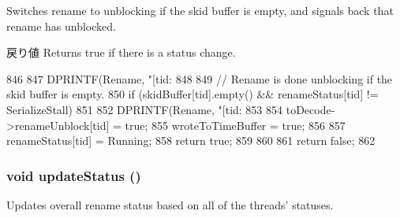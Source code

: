 \label{classDefaultRename_a9cc3b95f6969935f78c0158aa5145021}
Switches rename to unblocking if the skid buffer is empty, and signals back that rename has unblocked. \begin{DoxyReturn}{戻り値}
Returns true if there is a status change. 
\end{DoxyReturn}



\begin{DoxyCode}
846 {
847     DPRINTF(Rename, "[tid:%
848 
849     // Rename is done unblocking if the skid buffer is empty.
850     if (skidBuffer[tid].empty() && renameStatus[tid] != SerializeStall) {
851 
852         DPRINTF(Rename, "[tid:%
853 
854         toDecode->renameUnblock[tid] = true;
855         wroteToTimeBuffer = true;
856 
857         renameStatus[tid] = Running;
858         return true;
859     }
860 
861     return false;
862 }
\end{DoxyCode}
\hypertarget{classDefaultRename_a4bb9486757ce225941aaaf759b357a57}{
\subsubsection[{updateStatus}]{\setlength{\rightskip}{0pt plus 5cm}void updateStatus ()}}
\label{classDefaultRename_a4bb9486757ce225941aaaf759b357a57}
Updates overall rename status based on all of the threads' statuses. 


